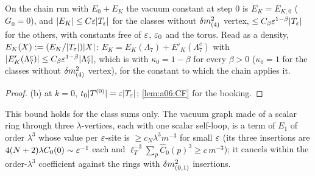 \begin{corollary}\label{cor:a06e:C1b}
On the chain run with $E_0+E_K$ the vacuum constant at step $0$ is $E_K=E_{K,0}$ ($G_0=0$), and $|E_K|\le C\varepsilon|T_{\varepsilon}|$ for the classes without $\delta m^2_{(4)}$ vertex, $\le C_\beta\varepsilon^{1-\beta}|T_{\varepsilon}|$ for the others, with constants free of $\varepsilon$, $\varepsilon_0$ and the torus. Read as a density, $E_K(X):=(E_K/|T_{\varepsilon}|)|X|$: $E_K=E_K(\Lambda_7)+E'_K(\Lambda_7^c)$ with $|E'_K(\Lambda_7^c)|\le C_\beta\varepsilon^{1-\beta}|\Lambda_7^c|$, which is \cite[(2.14)]{Ba2} with $\kappa_0=1-\beta$ for every $\beta>0$ ($\kappa_0=1$ for the classes without $\delta m^2_{(4)}$ vertex), for the constant to which the chain applies it.
\end{corollary}

\begin{proof}
(b) at $k=0$, $t_0|T^{(0)}|=\varepsilon|T_{\varepsilon}|$; \cref{lem:a06:CF} for the booking.
\end{proof}

This bound holds for the class sums only. The vacuum graph made of a scalar ring through three $\lambda$-vertices, each with one scalar self-loop, is a term of $E_1$ of order $\lambda^3$ whose value per $\varepsilon$-site is $\ge c_N\lambda^3m^{-3}$ for small $\varepsilon$ (its three insertions are $4(N+2)\lambda C_0(0)\sim\varepsilon^{-1}$ each and $\ell_T^{-3}\sum_p\hat C_0(p)^3\ge c\,m^{-3}$); it cancels within the order-$\lambda^3$ coefficient against the rings with $\delta m^2_{(0,1)}$ insertions.

